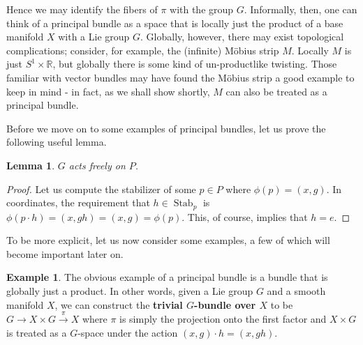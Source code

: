 \documentclass{book}
\newcommand{\R}{\mathbb{R}}
\DeclareMathOperator{\Stab}{Stab}
\theoremstyle{plain}
\newtheorem{lem}[thm]{Lemma}
\theoremstyle{definition}
\newtheorem{exmp}{Example}
\theoremstyle{remark}
\begin{document}
Hence we may identify the fibers of $\pi$ with the group $G$.
Informally, then, one can think of a principal bundle as a space that is locally just the product of a base manifold $X$ with a Lie group $G$.
Globally, however, there may exist topological complications; consider, for example, the (infinite) M\"obius strip $M$.
Locally $M$ is just $S^1\times \R$, but globally there is some kind of un-productlike twisting. Those familiar with vector bundles
may have found the M\"obius strip a good example to keep in mind - in fact, as we shall show shortly, $M$ can also be
treated as a principal bundle. 

Before we move on to some examples of principal bundles, let us prove the following useful lemma.

\begin{lem}
    $G$ acts freely on $P$.
\end{lem}
\begin{proof}
    Let us compute the stabilizer of some $p\in P$ where $\phi(p)=(x,g)$.
    In coordinates, the requirement that $h\in\Stab_p$ is
    $\phi(p\cdot h)=(x,gh)=(x,g)=\phi(p).$
    This, of course, implies that $h=e$.
\end{proof}

To be more explicit, let us now consider some examples, a few of which will become important later on.

\begin{exmp}
    The obvious example of a principal bundle is a bundle that is globally just a product. In other words, given
    a Lie group $G$ and a smooth manifold $X$, we can construct the \textbf{trivial $G$-bundle over $X$} to be
    $G\to X\times G\overset{\pi}{\to} X$ where $\pi$ is simply the projection onto the first factor and $X\times G$ is treated as
    a $G$-space under the action $(x,g)\cdot h=(x,gh)$. 
\end{exmp}
\end{document}
